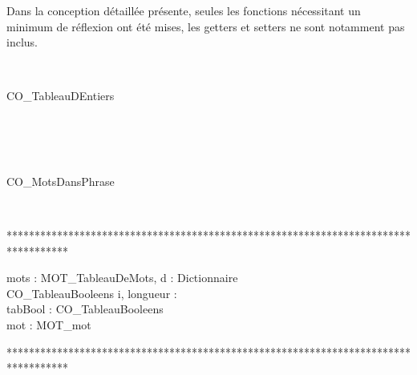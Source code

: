 \par Dans la conception d\'etaill\'ee pr\'esente, seules les fonctions n\'ecessitant un minimum de r\'eflexion ont \'et\'e mises, les getters et setters ne sont notamment pas inclus.\\


\begin{algorithme}

\\

\begin{enregistrement}{CO\_TableauDEntiers}
\end{enregistrement}\\

\\

\\

\begin{enregistrement}{CO\_MotsDansPhrase}
\end{enregistrement}\\

\end{algorithme}

***********************************************************************************

\begin{algorithme}
%
	{mots : MOT\_TableauDeMots, d : Dictionnaire}%
	{\\CO\_TableauBooleens}%
	{i, longueur : \naturel \\ tabBool : CO\_TableauBooleens\\ mot : MOT\_mot}%
	{%
	{	
		{
		}%
		{
			}
	}%
	}\\
\end{algorithme}
	
***********************************************************************************

